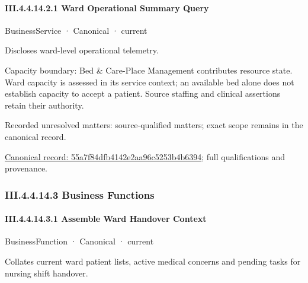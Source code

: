 \paragraph*{III.4.4.14.2.1 Ward Operational Summary Query}
\label{navigation:III.4.4.14.2.1}

\label{element:55a7f84dfb4142e2aa96c5253b4b6394}
{\small BusinessService · Canonical · current}\par

Discloses ward-level operational telemetry.



Capacity boundary: Bed \& Care-Place Management contributes resource state. Ward capacity is assessed in its service context; an available bed alone does not establish capacity to accept a patient. Source staffing and clinical assertions retain their authority.


{\small Recorded unresolved matters: source-qualified matters; exact scope remains in the canonical record.}\par
{\footnotesize \href{../../../../continuum/business/business-service/55a7f84dfb4142e2aa96c5253b4b6394.md}{Canonical record: 55a7f84dfb4142e2aa96c5253b4b6394}; full qualifications and provenance.}\par
\subsubsection*{III.4.4.14.3 Business Functions}
\label{navigation:III.4.4.14.3}

\paragraph*{III.4.4.14.3.1 Assemble Ward Handover Context}
\label{navigation:III.4.4.14.3.1}

\label{element:6006d70ed3794c57ab2bc57119292e4b}
{\small BusinessFunction · Canonical · current}\par

Collates current ward patient lists, active medical concerns and pending tasks for nursing shift handover.



